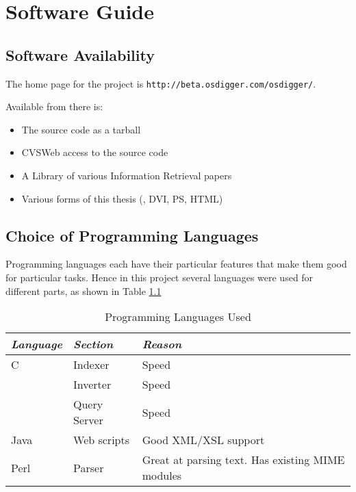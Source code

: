 
\chapter{Software Guide}

\section{Software Availability}
The home page for the project is \texttt{http://beta.osdigger.com/osdigger/}. 

Available from there is:
\begin{itemize}
\item The source code as a tarball
\item CVSWeb access to the source code
\item A Library of various Information Retrieval papers
\item Various forms of this thesis (\latex, DVI, PS, HTML)
\end{itemize}

\section{Choice of Programming Languages}
Programming languages each have their particular features that make them good for particular tasks.  Hence in this project several languages were used for different parts, as shown in Table \ref{tab:lang}

\begin{table}[htbp]
  \begin{center}
    \begin{tabular}{l|l|p{6cm}}
      \emph{Language} & \emph{Section} & \emph{Reason} \\
      \hline
      C    &  Indexer      &  Speed        \\
           &  Inverter     &  Speed        \\
           &  Query Server &  Speed     \\
      Java &  Web scripts  &  Good XML/XSL support   \\
      Perl &  Parser       &  Great at parsing text. Has existing MIME modules   \\    
    \end{tabular}
    \caption{Programming Languages Used}
    \label{tab:lang}
  \end{center}
\end{table}

